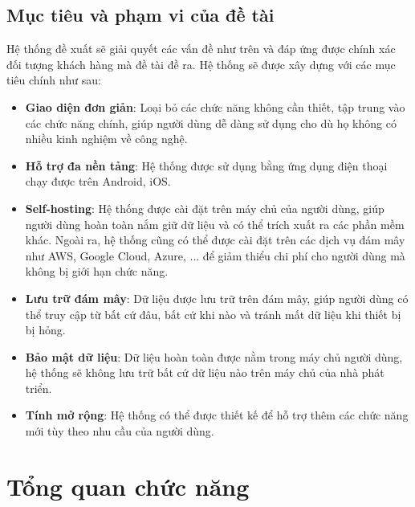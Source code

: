 \documentclass[../DoAn.tex]{subfiles}
\begin{document}
\subsection{Mục tiêu và phạm vi của đề tài}
\label{section:2.1.3}
Hệ thống đề xuất sẽ giải quyết các vấn đề như trên và đáp ứng được chính xác đối tượng khách hàng mà đề tài đề ra. Hệ thống sẽ được xây dựng với các mục tiêu chính như sau:
\begin{itemize}
    \item \textbf{Giao diện đơn giản}: Loại bỏ các chức năng không cần thiết, tập trung vào các chức năng chính, giúp người dùng dễ dàng sử dụng cho dù họ không có nhiều kinh nghiệm về công nghệ.
    \item \textbf{Hỗ trợ đa nền tảng}: Hệ thống được sử dụng bằng ứng dụng điện thoại chạy được trên Android, iOS.
    \item \textbf{Self-hosting}: Hệ thống được cài đặt trên máy chủ của người dùng, giúp người dùng hoàn toàn nắm giữ dữ liệu và có thể trích xuất ra các phần mềm khác. Ngoài ra, hệ thống cũng có thể được cài đặt trên các dịch vụ đám mây như AWS, Google Cloud, Azure, ... để giảm thiểu chi phí cho người dùng mà không bị giới hạn chức năng.
    \item \textbf{Lưu trữ đám mây}: Dữ liệu được lưu trữ trên đám mây, giúp người dùng có thể truy cập từ bất cứ đâu, bất cứ khi nào và tránh mất dữ liệu khi thiết bị bị hỏng.
    \item \textbf{Bảo mật dữ liệu}: Dữ liệu hoàn toàn được nằm trong máy chủ người dùng, hệ thống sẽ không lưu trữ bất cứ dữ liệu nào trên máy chủ của nhà phát triển.
    \item \textbf{Tính mở rộng}: Hệ thống có thể được thiết kế để hỗ trợ thêm các chức năng mới tùy theo nhu cầu của người dùng.
\end{itemize}
\break

\section{Tổng quan chức năng}
\label{section:general-function}
\end{document}
